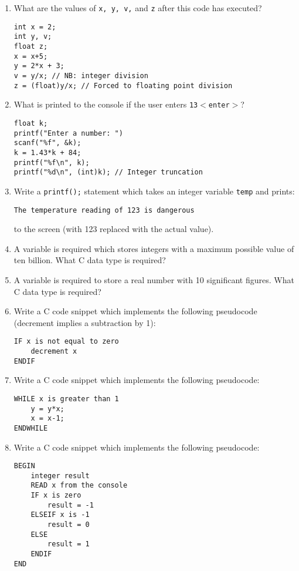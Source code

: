 \documentclass{lab}
\begin{document}
\begin{enumerate}
\item What are the values of \texttt{x, y, v,} and \texttt{z} after this code has executed?
\begin{lstlisting}[style=CStyle]
int x = 2;
int y, v;
float z;
x = x+5;
y = 2*x + 3;
v = y/x; // NB: integer division
z = (float)y/x; // Forced to floating point division
\end{lstlisting}
\item What is printed to the console if the user enters \texttt{13$<$enter$>$}?
\begin{lstlisting}[style=CStyle]
float k;
printf("Enter a number: ")
scanf("%f", &k);
k = 1.43*k + 84;
printf("%f\n", k);
printf("%d\n", (int)k); // Integer truncation
\end{lstlisting}
\item Write a \texttt{printf();} statement which takes an integer variable \texttt{temp} and prints:

\texttt{The temperature reading of 123 is dangerous}

to the screen (with 123 replaced with the actual value).
\item A variable is required which stores integers with a maximum possible value of ten billion. What C data type is required?
\item A variable is required to store a real number with 10 significant figures. What C data type is required?
\item Write a C code snippet which implements the following pseudocode (decrement implies a subtraction by 1):
\begin{lstlisting}[style=pseudo]
IF x is not equal to zero
	decrement x
ENDIF
\end{lstlisting}
 
\item Write a C code snippet which implements the following pseudocode:
\begin{lstlisting}[style=pseudo]
WHILE x is greater than 1
	y = y*x;
	x = x-1;
ENDWHILE
\end{lstlisting}
\item Write a C code snippet which implements the following pseudocode:
\begin{lstlisting}[style=pseudo]
BEGIN
	integer result
	READ x from the console
	IF x is zero
		result = -1
	ELSEIF x is -1
		result = 0
	ELSE
		result = 1
	ENDIF
END
\end{lstlisting}
\end{enumerate}
\end{document}
